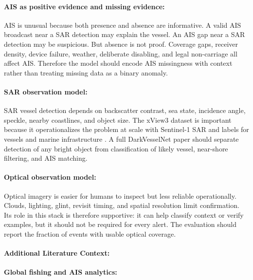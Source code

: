 \documentclass{article}
\begin{document}
\paragraph{AIS as positive evidence and missing evidence:}

AIS is unusual because both presence and absence are informative. A valid AIS broadcast near a SAR detection may explain the vessel. An AIS gap near a SAR detection may be suspicious. But absence is not proof. Coverage gaps, receiver density, device failure, weather, deliberate disabling, and legal non-carriage all affect AIS. Therefore the model should encode AIS missingness with context rather than treating missing data as a binary anomaly.

\paragraph{SAR observation model:}

SAR vessel detection depends on backscatter contrast, sea state, incidence angle, speckle, nearby coastlines, and object size. The xView3 dataset is important because it operationalizes the problem at scale with Sentinel-1 SAR and labels for vessels and marine infrastructure \citep{paolo2022xview3}. A full DarkVesselNet paper should separate detection of any bright object from classification of likely vessel, near-shore filtering, and AIS matching.

\paragraph{Optical observation model:}

Optical imagery is easier for humans to inspect but less reliable operationally. Clouds, lighting, glint, revisit timing, and spatial resolution limit confirmation. Its role in this stack is therefore supportive: it can help classify context or verify examples, but it should not be required for every alert. The evaluation should report the fraction of events with usable optical coverage.

\paragraph{Additional Literature Context:}

\paragraph{Global fishing and AIS analytics:}
\end{document}
